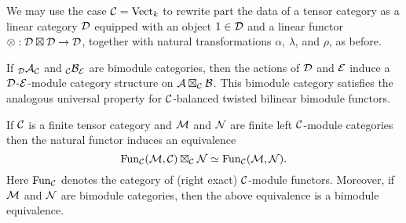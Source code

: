\documentclass{amsart}
\begin{document}


\begin{remark} \label{rmk:rigidpreservedbytensor}
	We may use the case $\mathcal C= \mathrm{Vect}_k$ to rewrite part the data  of a tensor category as a linear category $\mathcal D$ equipped with an object $1 \in \mathcal D$ and a linear functor $\otimes: \mathcal D \boxtimes \mathcal D \to \mathcal D $, together with natural transformations $\alpha$, $\lambda$, and $\rho$, as before. %
\end{remark}

\begin{remark}
	If ${}_{\mathcal D}\mathcal A_{\mathcal C}$ and ${}_{\mathcal C}\mathcal B_{\mathcal E}$ are bimodule categories, then the actions of $\mathcal D$ and $\mathcal E$ induce a $\mathcal D$-$\mathcal E$-module category structure on $\mathcal A \boxtimes_{\mathcal C} \mathcal B$. This bimodule category satisfies the analogous universal property for $\mathcal C$-balanced twisted bilinear bimodule functors. 
\end{remark}

\begin{lemma} \label{Lma:FunctorsAsATensorPdt}
	If $\mathcal C$ is a finite tensor category and $\mathcal M$ and $\mathcal N$ are finite left $\mathcal C$-module categories then the natural functor induces an equivalence
	\begin{equation*}
		\operatorname{Fun}_\mathcal C(\mathcal M, \mathcal C) \boxtimes_\mathcal C \mathcal N \simeq \operatorname{Fun}_\mathcal C(\mathcal M,\mathcal N).
	\end{equation*}
	Here $\operatorname{Fun}_\mathcal C$ denotes the category of (right exact) $\mathcal C$-module functors. 
	Moreover, if $\mathcal M$ and $\mathcal N$ are bimodule categories, then the above equivalence is a bimodule equivalence. 
\end{lemma}
\end{document}
